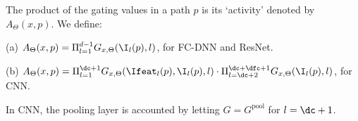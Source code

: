 \begin{definition}
The product of the gating values in a path $p$ is its `activity' denoted by $A_{\Theta}(x,p)$. We define:

(a) $A_{\Theta}(x,p)=\Pi_{l=1}^{d-1} G_{x,\Theta}(\I_l(p),l)$, for FC-DNN and ResNet.

(b) $A_{\Theta}(x,p)=\Pi_{l=1}^{\dc+1} G_{x,\Theta}(\Ifeat_l(p),\I_l(p),l)\cdot\Pi_{l=\dc+2}^{\dc+\dfc+1} G_{x,\Theta}(\I_l(p),l)$, for CNN.

In CNN, the pooling layer is accounted by letting $G=G^{\text{pool}}$ for $l=\dc+1$.

\end{definition}

